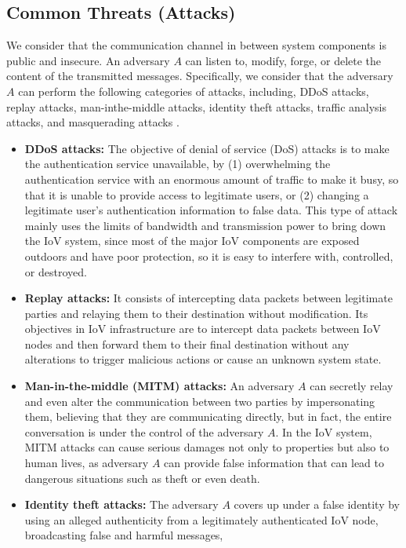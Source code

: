 			\subsection{Common Threats (Attacks)}
				We consider that the communication channel in between system components is public and insecure. An adversary $A$ can listen to, modify, forge, or delete the content of the transmitted messages. Specifically, we consider that the adversary $A$ can perform the following categories of attacks, including, DDoS attacks, replay attacks, man-inthe-middle attacks, identity theft attacks, traffic analysis attacks, and masquerading attacks \cite{paper11}.
				\begin{itemize}
					\let\labelitemi\labelitemii
					\item \textbf{DDoS attacks:} The objective of denial of service (DoS) attacks is to make the authentication service unavailable, by (1) overwhelming the authentication service with an enormous amount of traffic to make it busy, so that it is unable to provide access to legitimate users, or (2) changing a legitimate user’s authentication information to false data. This type of attack mainly uses the limits of bandwidth and transmission power to bring down the IoV system, since most of the major IoV components are exposed outdoors and have poor protection, so it is easy to interfere with, controlled, or destroyed.
					\item \textbf{Replay attacks:} It consists of intercepting data packets between legitimate parties and relaying them to their destination without
					modification. Its objectives in IoV infrastructure are to intercept data packets between IoV nodes and then forward them to their final destination without any alterations to trigger malicious actions or cause an unknown system state.
					\item \textbf{Man-in-the-middle (MITM) attacks:} An adversary $A$ can secretly relay and even alter the communication between two parties by impersonating them, believing that they are communicating directly, but in fact, the entire conversation is under the control of the adversary $A$. In the IoV system, MITM attacks can cause serious damages not only to properties but also to human lives, as adversary $A$ can provide false information that can lead to dangerous situations such as theft or even death.
					\item \textbf{Identity theft attacks:} The adversary $A$ covers up under a false identity by using an alleged authenticity from a legitimately authenticated IoV node, broadcasting false and harmful messages,

\end{itemize}
